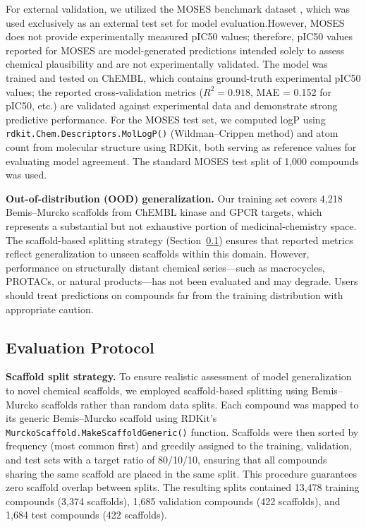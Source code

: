 \documentclass[preprint,12pt]{elsarticle}
\begin{document}
For external validation, we utilized the MOSES benchmark dataset \cite{polykovskiy2020molecular}, which was used exclusively as an external test set for model evaluation.However, MOSES does not provide experimentally measured pIC50 values; therefore, pIC50 values reported for MOSES are model-generated predictions intended solely to assess chemical plausibility and are not experimentally validated. The model was trained and tested on ChEMBL, which contains ground-truth experimental pIC50 values; the reported cross-validation metrics ($R^2 = 0.918$, MAE = 0.152 for pIC50, etc.) are validated against experimental data and demonstrate strong predictive performance. For the MOSES test set, we computed logP using \texttt{rdkit.Chem.Descriptors.MolLogP()} (Wildman--Crippen method) and atom count from molecular structure using RDKit, both serving as reference values for evaluating model agreement. The standard MOSES test split of 1,000 compounds was used.

\textbf{Out-of-distribution (OOD) generalization.}
Our training set covers 4,218 Bemis--Murcko scaffolds from ChEMBL kinase and GPCR targets, which represents a substantial but not exhaustive portion of medicinal-chemistry space. The scaffold-based splitting strategy (Section~\ref{subsec:eval_protocol}) ensures that reported metrics reflect generalization to unseen scaffolds within this domain. However, performance on structurally distant chemical series---such as macrocycles, PROTACs, or natural products---has not been evaluated and may degrade. Users should treat predictions on compounds far from the training distribution with appropriate caution.

\subsection{Evaluation Protocol}
\label{subsec:eval_protocol}

\textbf{Scaffold split strategy.}
To ensure realistic assessment of model generalization to novel chemical scaffolds, we employed scaffold-based splitting using Bemis--Murcko scaffolds \cite{bemis1996properties} rather than random data splits. Each compound was mapped to its generic Bemis--Murcko scaffold using RDKit's \texttt{MurckoScaffold.MakeScaffoldGeneric()} function. Scaffolds were then sorted by frequency (most common first) and greedily assigned to the training, validation, and test sets with a target ratio of 80/10/10, ensuring that all compounds sharing the same scaffold are placed in the same split. This procedure guarantees zero scaffold overlap between splits. The resulting splits contained 13,478 training compounds (3,374 scaffolds), 1,685 validation compounds (422 scaffolds), and 1,684 test compounds (422 scaffolds).
\end{document}
